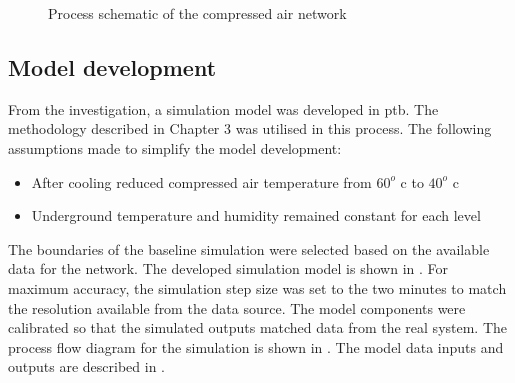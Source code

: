 	\begin{figure}[h!]
		\centering
		\caption{Process schematic of the compressed air network}
		\label{fig: KUS Air layout}
	\end{figure}
\clearpage

\subsection{Model development}
	
From the investigation, a simulation model was developed in \gls{ptb}. The methodology described in Chapter 3 was utilised in this process. The following assumptions made to simplify the model development:
\begin{itemize}
	\item After cooling reduced compressed air temperature from $ 60 ^o $ \gls{c} to $ 40 ^o $ \gls{c}
	\item Underground temperature and humidity remained constant for each level
\end{itemize}
 The boundaries of the baseline simulation were selected based on the available data for the network. The developed simulation model is shown in . For maximum accuracy, the simulation step size was set to the two minutes to match the resolution available from the data source.
The model components were calibrated so that the simulated outputs matched data from the real system. The process flow diagram for the simulation is shown in . The model data inputs and outputs are described in .

